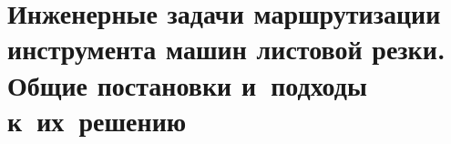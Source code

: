 

\part{
  Инженерные задачи
  маршрутизации инструмента машин листовой резки.
  Общие постановки
  и~подходы к~их~решению
}



